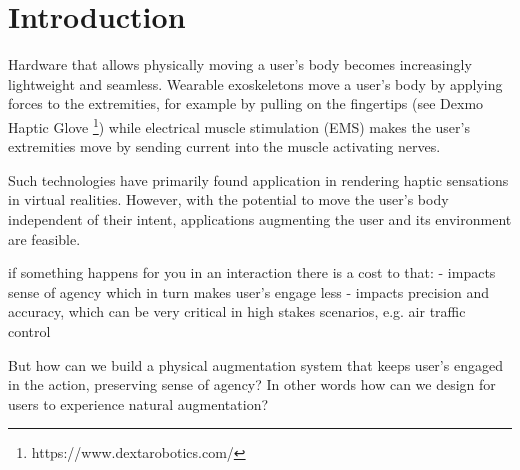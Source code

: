 \section{Introduction}


Hardware that allows physically moving a user's body becomes increasingly lightweight and seamless. Wearable exoskeletons move a user's body by applying forces to the extremities, for example by pulling on the fingertips (see Dexmo Haptic Glove \footnote{https://www.dextarobotics.com/}) while electrical muscle stimulation (EMS) makes the user's extremities move by sending current into the muscle activating nerves.

Such technologies have primarily found application in rendering haptic sensations in virtual realities. However, with the potential to move the user's body independent of their intent, applications augmenting the user and its environment are feasible.


if something happens for you in an interaction there is a cost to that:
- impacts sense of agency which in turn makes user's engage less
- impacts precision and accuracy, which can be very critical in high stakes scenarios, e.g. air traffic control


But how can we build a physical augmentation system that keeps user's engaged in the action, preserving sense of agency? In other words how can we design for users to experience natural augmentation?


